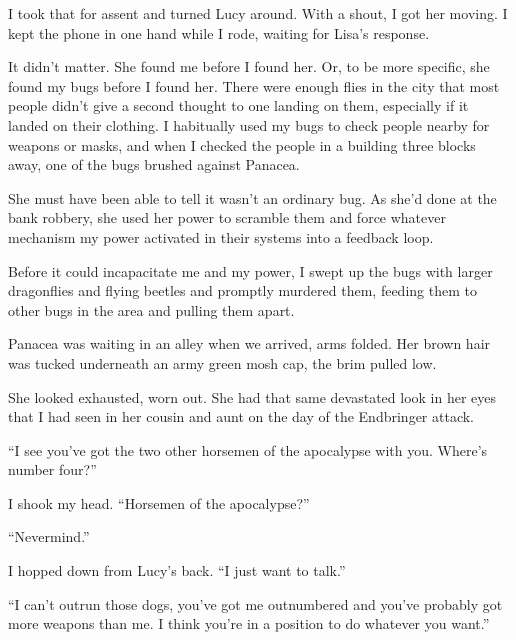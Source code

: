 I took that for assent and turned Lucy around.  With a shout, I got her moving.  I kept the phone in one hand while I rode, waiting for Lisa's response.



It didn't matter.  She found me before I found her.  Or, to be more specific, she found my bugs before I found her.  There were enough flies in the city that most people didn't give a second thought to one landing on them, especially if it landed on their clothing.  I habitually used my bugs to check people nearby for weapons or masks, and when I checked the people in a building three blocks away, one of the bugs brushed against Panacea.



She must have been able to tell it wasn't an ordinary bug.  As she'd done at the bank robbery, she used her power to scramble them and force whatever mechanism my power activated in their systems into a feedback loop.



Before it could incapacitate me and my power, I swept up the bugs with larger dragonflies and flying beetles and promptly murdered them, feeding them to other bugs in the area and pulling them apart.



Panacea was waiting in an alley when we arrived, arms folded.  Her brown hair was tucked underneath an army green mosh cap, the brim pulled low.



She looked exhausted, worn out.  She had that same devastated look in her eyes that I had seen in her cousin and aunt on the day of the Endbringer attack.



``I see you've got the two other horsemen of the apocalypse with you.  Where's number four?''



I shook my head.  ``Horsemen of the apocalypse?''



``Nevermind.''



I hopped down from Lucy's back.  ``I just want to talk.''



``I can't outrun those dogs, you've got me outnumbered and you've probably got more weapons than me.  I think you're in a position to do whatever you want.''



